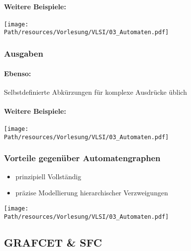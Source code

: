 		\paragraph{Weitere Beispiele:}
		\begin{center}
			\texttt{[image: \\Path/resources/Vorlesung/VLSI/03\_Automaten.pdf]}
		\end{center}
		
	
	\subsubsection{Ausgaben}
		\paragraph{Ebenso:}
		Selbstdefinierte Abkürzungen für komplexe Ausdrücke üblich
		
		\paragraph{Weitere Beispiele:}
		\begin{center}
			\texttt{[image: \\Path/resources/Vorlesung/VLSI/03\_Automaten.pdf]}
		\end{center}
	
	\subsubsection{Vorteile gegenüber Automatengraphen}
		\begin{itemize}
			\item prinzipiell Vollständig
			\item präzise Modellierung hierarchischer Verzweigungen
		\end{itemize}
		\begin{center}
			\texttt{[image: \\Path/resources/Vorlesung/VLSI/03\_Automaten.pdf]}
		\end{center}
			

\subsection{GRAFCET \& SFC}
